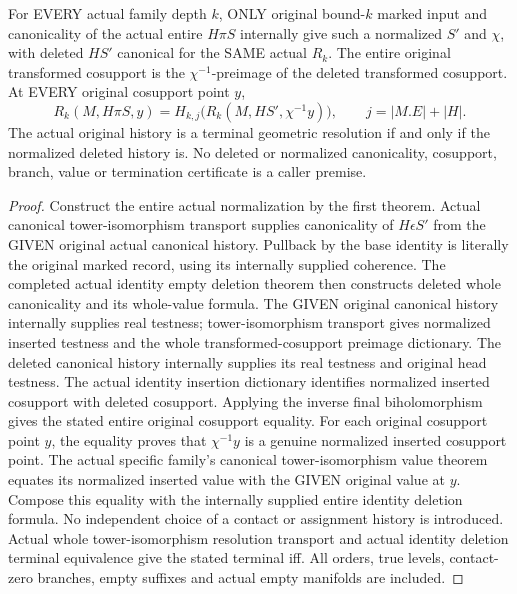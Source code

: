 \begin{theorem}
\label{hir:original-actual-empty-family-canonical-deletion}
\leanok
For EVERY actual family depth $k$, ONLY original bound-$k$ marked input and
canonicality of the actual entire $H\pi S$ internally give such a normalized
$S'$ and $\chi$, with deleted $HS'$ canonical for the SAME actual $R_k$.
The entire original transformed cosupport is the $\chi^{-1}$-preimage of the
deleted transformed cosupport. At EVERY original cosupport point $y$,
\[
 R_k(M,H\pi S,y)=H_{k,j}\bigl(R_k(M,HS',\chi^{-1}y)\bigr),
 \qquad j=|M.E|+|H|.
\]
The actual original history is a terminal geometric resolution if and only
if the normalized deleted history is. No deleted or normalized canonicality,
cosupport, branch, value or termination certificate is a caller premise.
\end{theorem}
\begin{proof}
Construct the entire actual normalization by the first theorem. Actual
canonical tower-isomorphism transport supplies canonicality of $H\epsilon
S'$ from the GIVEN original actual canonical history. Pullback by the base
identity is literally the original marked record, using its internally
supplied coherence. The completed actual identity empty deletion theorem
then constructs deleted whole canonicality and its whole-value formula.
The GIVEN original canonical history internally supplies real testness;
tower-isomorphism transport gives normalized inserted testness and the whole
transformed-cosupport preimage dictionary. The deleted canonical history
internally supplies its real testness and original head testness. The actual
identity insertion dictionary identifies normalized inserted cosupport with
deleted cosupport. Applying the inverse final biholomorphism gives the
stated entire original cosupport equality. For each original cosupport point
$y$, the equality proves that $\chi^{-1}y$ is a genuine normalized inserted
cosupport point. The actual specific family's canonical tower-isomorphism
value theorem equates its normalized inserted value with the GIVEN original
value at $y$. Compose this equality with the internally supplied entire
identity deletion formula. No independent choice of a contact or assignment
history is introduced. Actual whole tower-isomorphism resolution transport
and actual identity deletion terminal equivalence give the stated terminal
iff. All orders, true levels, contact-zero branches, empty suffixes and
actual empty manifolds are included.
\end{proof}

